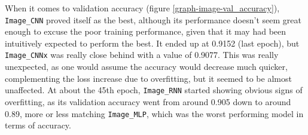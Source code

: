 When it comes to validation accuracy (figure \ref{graph-image-val_accuracy}),
\texttt{Image\_CNN} proved itself as the best, although its performance
doesn't seem great enough to excuse the poor training performance, given that it may had been intuitively expected
to perform the best. It ended up at 0.9152 (last epoch), but \texttt{Image\_CNNx} was really close behind with a value
of 0.9077. This was really unexpected, as one would assume the accuracy would decrease much quicker, complementing the loss
increase due to overfitting, but it seemed to be almost unaffected.
At about the 45th epoch, \texttt{Image\_RNN} started showing obvious signs of overfitting, as its validation accuracy
went from around 0.905 down to around 0.89, more or less matching \texttt{Image\_MLP}, which was the worst
performing model in terms of accuracy.


